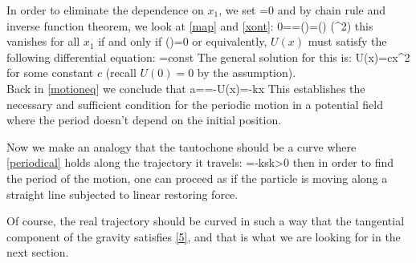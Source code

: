 In order to eliminate the dependence on $x_1$, we set
\eq
{
=0
}
and by chain rule and inverse function theorem, we look at \eqref{map} and
\eqref{xont}:
\eq
{
0==\left(\right)\cdot {}=\left(\right)
\left(\tau^2\right)
}
this vanishes for all $x_1$ if and only if
\eq
{
\left(\right)=0
}
or equivalently, $U(x)$ must satisfy the following differential equation:
\eq
{
=\rm const
} 
The general solution for this is:
\eq
{
U(x)=cx^2
}
for some constant $c$ (recall $U(0)=0$ by the assumption).\\
Back in \eqref{motioneq} we conclude that
\eq
{
a==-U(x)=-kx
}
This establishes the necessary and sufficient condition for the periodic motion in a potential field where the period doesn't depend on the initial position. 

Now we make an analogy that the tautochone should be a curve where \eqref{periodical} holds along the trajectory it travels:
{
=-ks\quad k>0
}
then in order to find the period of the motion, one can proceed as if the particle is moving along a straight line subjected to linear restoring force.

Of course, the real trajectory should be curved in such a way that the tangential
component of the gravity satisfies \eqref{5}, and that is what we are looking for in the next section.

